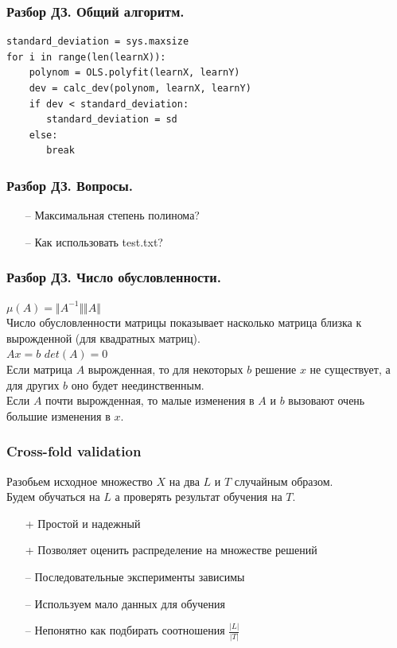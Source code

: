 \documentclass[12pt]{beamer}
\subtitle{Лекция 2. Метрические методы классификации}
\begin{document}
\frame{\titlepage}
\begin{frame}[fragile]\frametitle{Разбор ДЗ. Общий алгоритм.}

\begin{lstlisting}[frame=single]
standard_deviation = sys.maxsize
for i in range(len(learnX)):
    polynom = OLS.polyfit(learnX, learnY)
    dev = calc_dev(polynom, learnX, learnY)
    if dev < standard_deviation:
       standard_deviation = sd
    else:
       break
\end{lstlisting}

\end{frame}

\begin{frame}\frametitle{Разбор ДЗ. Вопросы.}
\begin{itemize}
	\item[--] Максимальная степень полинома?
	\item[--] Как использовать test.txt?
\end{itemize}
\end{frame}

\begin{frame}\frametitle{Разбор ДЗ. Число обусловленности.}
${\mu(A) = \Vert A^{-1} \Vert \Vert A \Vert}$\\
\vspace{5mm}
Число обусловленности матрицы показывает насколько матрица близка к вырожденной (для квадратных матриц).\\
\vspace{5mm}
${Ax=b}$  \hspace{15mm}  ${det(A) = 0}$\\
\vspace{5mm}
Если матрица $A$ вырожденная, то для некоторых $b$ решение $x$ не существует, а для других $b$ оно будет неединственным.\\
Если $A$ почти вырожденная, то малые изменения в $A$ и $b$ вызовают очень большие изменения в $x$.

\end{frame}


\begin{frame}\frametitle{Cross-fold validation}
Разобьем исходное множество $X$
на два $L$ и $T$ случайным образом.\\
Будем обучаться на $L$ а проверять результат обучения на $T$.\\
\begin{itemize}
\item[+] Простой и надежный
\item[+] Позволяет оценить распределение на множестве
решений

\end{itemize}
\begin{itemize}
\item[--] Последовательные эксперименты зависимы 
\item[--] Используем мало данных для обучения
\item[--] Непонятно как подбирать соотношения ${\frac{\vert L \vert}{\vert T \vert}}$

\end{itemize}
\end{frame}
\end{document}
